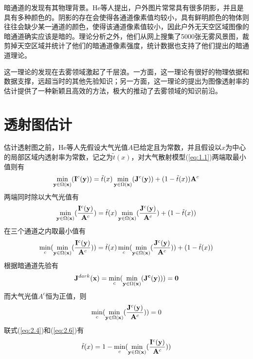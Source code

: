 \documentclass[a4paper, 12pt, oneside]{report}
\begin{document}
{暗通道的发现有其物理背景。He等人提出，户外图片常常具有很多阴影，并且是具有多种颜色的。阴影的存在会使得各通道像素值均较小，具有鲜明颜色的物体则往往会缺少某一通道的颜色，使得该通道像素值较小，因此户外无天空区域图像的暗通道确实应该是暗的。理论分析之外，他们从网上搜集了5000张无雾风景图，裁剪掉天空区域并统计了他们的暗通道像素强度，统计数据也支持了他们提出的暗通道理论。

这一理论的发现在去雾领域激起了千层浪。一方面，这一理论有很好的物理依据和数据支撑，远超当时的其他先验知识；另一方面，这一理论的提出为图像透射率的估计提供了一种新颖且高效的方法，极大的推动了去雾领域的知识前沿。

\section{透射图估计\quad } \label{transmission}
估计透射图之前，He等人先假设大气光值$A$已给定且为常数，并且假设以$x$为中心的局部区域内透射率为常数，记之为$\tilde{t}(x)$，对大气散射模型(\ref{eq:1.1})两端取最小值则有
\begin{equation} \label{eq:2.2}
\min_{{\bf y} \in \Omega({\bf x})}({\bf I}^c({\bf y})) = \tilde{t}(x) \min_{{\bf y} \in \Omega({\bf x})}({\bf J}^c({\bf y})) + (1-\tilde{t}(x)){\bf A}^c
\end{equation}
两端同时除以大气光值有
\begin{equation} \label{eq:2.3}
\min_{{\bf y} \in \Omega({\bf x})}(\frac{{\bf I}^c({\bf y})}{{\bf A}^c}) = \tilde{t}(x)\min_{{\bf y} \in \Omega({\bf x})}(\frac{{\bf J}^c({\bf y})}{{\bf A}^c}) + (1-\tilde{t}(x))
\end{equation}
在三个通道之内取最小值有
\begin{equation} \label{eq:2.4}
\min_c(\min_{{\bf y} \in \Omega({\bf x})}(\frac{{\bf I}^c({\bf y})}{{\bf A}^c})) = \tilde{t}(x)\min_c(\min_{{\bf y} \in \Omega({\bf x})}(\frac{{\bf J}^c({\bf y})}{{\bf A}^c})) + (1-\tilde{t}(x))
\end{equation}
根据暗通道先验有
\begin{equation} \label{eq:2.5}
{\bf J}^{dark}{\bf (x)} = \min_c(\min_{{\bf y} \in \Omega({\bf x})}(\bf J^c(y))) = 0
\end{equation}
而大气光值$A^c$恒为正值，则
\begin{equation} \label{eq:2.6}
\min_c(\min_{{\bf y} \in \Omega({\bf x})}(\frac{{\bf J}^c({\bf y})}{{\bf A}^c})) = 0
\end{equation}
联式(\ref{eq:2.4})和(\ref{eq:2.6})有
\begin{equation} \label{eq:2.7}
\tilde{t}(x) = 1 - \min_c(\min_{{\bf y} \in \Omega({\bf x})}(\frac{{\bf I}^c({\bf y})}{{\bf A}^c}))
\end{equation}

}
\end{document}
